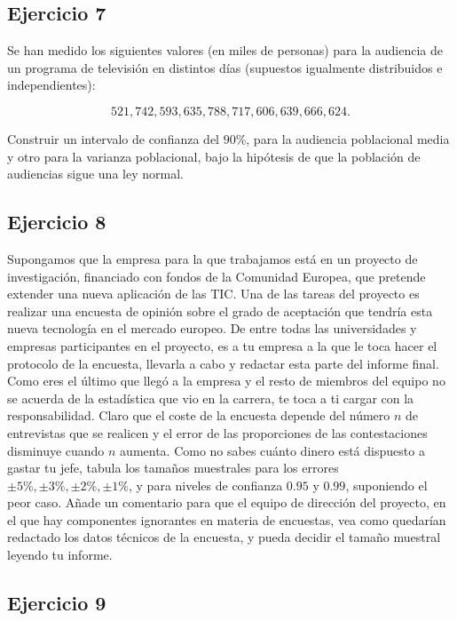 \documentclass[
]{article}
\begin{document}
\hypertarget{ejercicio-7-1}{%
\subsection{Ejercicio 7}\label{ejercicio-7-1}}

Se han medido los siguientes valores (en miles de personas) para la
audiencia de un programa de televisión en distintos días (supuestos
igualmente distribuidos e independientes):

\[521, 742, 593, 635, 788, 717, 606, 639, 666, 624.\]

Construir un intervalo de confianza del \(90\)\%, para la audiencia
poblacional media y otro para la varianza poblacional, bajo la hipótesis
de que la población de audiencias sigue una ley normal.

\hypertarget{ejercicio-8}{%
\subsection{Ejercicio 8}\label{ejercicio-8}}

Supongamos que la empresa para la que trabajamos está en un proyecto de
investigación, financiado con fondos de la Comunidad Europea, que
pretende extender una nueva aplicación de las TIC. Una de las tareas del
proyecto es realizar una encuesta de opinión sobre el grado de
aceptación que tendría esta nueva tecnología en el mercado europeo. De
entre todas las universidades y empresas participantes en el proyecto,
es a tu empresa a la que le toca hacer el protocolo de la encuesta,
llevarla a cabo y redactar esta parte del informe final. Como eres el
último que llegó a la empresa y el resto de miembros del equipo no se
acuerda de la estadística que vio en la carrera, te toca a ti cargar con
la responsabilidad. Claro que el coste de la encuesta depende del número
\(n\) de entrevistas que se realicen y el error de las proporciones de
las contestaciones disminuye cuando \(n\) aumenta. Como no sabes cuánto
dinero está dispuesto a gastar tu jefe, tabula los tamaños muestrales
para los errores \(\pm 5\%, \pm 3\%, \pm 2\%,\pm 1\%\), y para niveles
de confianza \(0.95\) y \(0.99\), suponiendo el peor caso. Añade un
comentario para que el equipo de dirección del proyecto, en el que hay
componentes ignorantes en materia de encuestas, vea como quedarían
redactado los datos técnicos de la encuesta, y pueda decidir el tamaño
muestral leyendo tu informe.

\hypertarget{ejercicio-9}{%
\subsection{Ejercicio 9}\label{ejercicio-9}}
\end{document}
